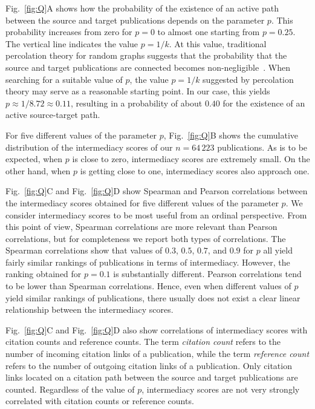 \documentclass[9pt,twocolumn,twoside]{pnas-alt} %
\theoremstyle{definition}
\newcommand{\subfigref}[2]{Fig.~\ref{fig:#1}#2\xspace}
\begin{document}
\subfigref{Q}{A} shows how the probability of the existence of an active path between the source and target publications depends on the parameter $p$. This probability increases from zero for $p = 0$ to almost one starting from $p = 0.25$. The vertical line indicates the value $p = 1 / k$. At this value, traditional percolation theory for random graphs suggests that the probability that the source and target publications are connected becomes non-negligible~\cite{Newman2018}. When searching for a suitable value of $p$, the value $p = 1 / k$ suggested by percolation theory may serve as a reasonable starting point. In our case, this yields $p \approx 1 / 8.72 \approx 0.11$, resulting in a probability of about $0.40$ for the existence of an active source-target path.

For five different values of the parameter $p$, \subfigref{Q}{B} shows the cumulative distribution of the intermediacy scores of our $n = 64\,223$ publications. As is to be expected, when $p$ is close to zero, intermediacy scores are extremely small. On the other hand, when $p$ is getting close to one, intermediacy scores also approach one.

\subfigref{Q}{C} and \subfigref{Q}{D} show Spearman and Pearson correlations between the intermediacy scores obtained for five different values of the parameter $p$. We consider intermediacy scores to be most useful from an ordinal perspective. From this point of view, Spearman correlations are more relevant than Pearson correlations, but for completeness we report both types of correlations. The Spearman correlations show that values of $0.3$, $0.5$, $0.7$, and $0.9$ for $p$ all yield fairly similar rankings of publications in terms of intermediacy. However, the ranking obtained for $p = 0.1$ is substantially different. Pearson correlations tend to be lower than Spearman correlations. Hence, even when different values of $p$ yield similar rankings of publications, there usually does not exist a clear linear relationship between the intermediacy scores.

\subfigref{Q}{C} and \subfigref{Q}{D} also show correlations of intermediacy scores with citation counts and reference counts. The term \emph{citation count} refers to the number of incoming citation links of a publication, while the term \emph{reference count} refers to the number of outgoing citation links of a publication. Only citation links located on a citation path between the source and target publications are counted. Regardless of the value of $p$, intermediacy scores are not very strongly correlated with citation counts or reference counts.
\end{document}
